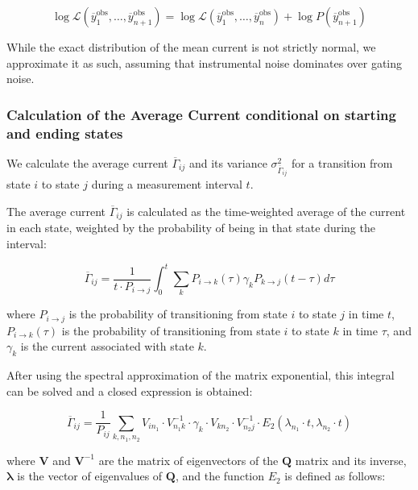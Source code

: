 \documentclass[pdflatex,sn-mathphys-num]{sn-jnl}%
\theoremstyle{thmstyleone}%
\theoremstyle{thmstyletwo}%
\theoremstyle{thmstylethree}%
\begin{document}
\begin{equation}
	\log \mathcal{L}(\overline{y}_1^{\text{obs}}, \dots, \overline{y}_{n+1}^{\text{obs}}) = \log \mathcal{L}(\overline{y}_1^{\text{obs}}, \dots, \overline{y}_n^{\text{obs}}) + \log P(\overline{y}_{n+1}^{\text{obs}})
\end{equation}

While the exact distribution of the mean current is not strictly normal, we approximate it as such, assuming that instrumental noise dominates over gating noise.



\subsubsection{Calculation of the Average Current conditional on starting and ending states} 

We calculate the average current $\overline{\Gamma}_{ij}$ and its variance $\sigma^2_{\overline{\Gamma}_{ij}}$ for a transition from state $i$ to state $j$ during a measurement interval $t$.

The average current $\overline{\Gamma}_{ij}$ is calculated as the time-weighted average of the current in each state, weighted by the probability of being in that state during the interval:

\begin{equation}
	\overline{\Gamma}_{ij} = \frac{1}{t \cdot P_{i \rightarrow j}} \int_0^t \sum_k P_{i \rightarrow k}(\tau) \gamma_k P_{k \rightarrow j}(t-\tau) d\tau
\end{equation}

where $P_{i \rightarrow j}$ is the probability of transitioning from state $i$ to state $j$ in time $t$, $P_{i \rightarrow k}(\tau)$ is the probability of transitioning from state $i$ to state $k$ in time $\tau$, and $\gamma_k$ is the current associated with state $k$.

After using the spectral approximation of the matrix exponential, this integral can be solved and a closed expression is obtained: 

\begin{equation}
	\overline{\Gamma}_{ij} = \frac{1}{P_{ij}}\sum_{k,n_1,n_2} V_{i n_1} \cdot V^{-1}_{n_1 k} \cdot \gamma_k \cdot V_{k n_2} \cdot V^{-1}_{n_2 j} \cdot E_2(\lambda_{n_1} \cdot t, \lambda_{n_2} \cdot t) 
\end{equation}

where $\mathbf{V}$ and $\mathbf{V}^{-1}$ are the matrix of eigenvectors of the $\mathbf{Q}$ matrix and its inverse, $\boldsymbol{\lambda}$ is the vector of eigenvalues of $\mathbf{Q}$, and the function $E_2$ is defined as follows: 
\end{document}
